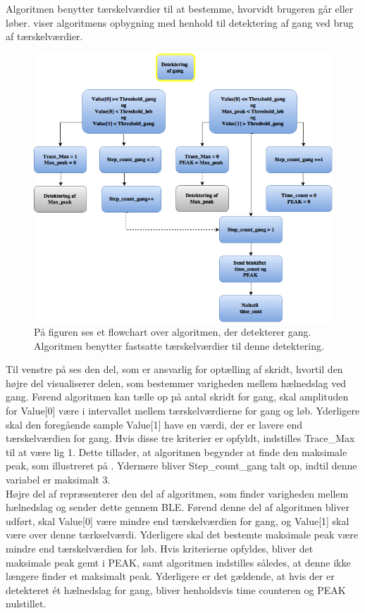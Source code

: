 Algoritmen benytter tærskelværdier til at bestemme, hvorvidt brugeren går eller løber.  viser algoritmens opbygning med henhold til detektering af gang ved brug af tærskelværdier.
\begin{figure}[H]
	\centering
	\includegraphics[scale=0.6]{figures/cDesign/gang_ckode_pseudo.png}
	\caption{På figuren ses et flowchart over algoritmen, der detekterer gang. Algoritmen benytter fastsatte tærskelværdier til denne detektering.}
	\label{fig:gang_pseudo}
\end{figure}\vspace{-0.25cm}
Til venstre på  ses den del, som er ansvarlig for optælling af skridt, hvortil den højre del visualiserer delen, som bestemmer varigheden mellem hælnedslag ved gang. Førend algoritmen kan tælle op på antal skridt for gang, skal amplituden for Value[0] være i intervallet mellem tærskelværdierne for gang og løb. Yderligere skal den foregående sample Value[1] have en værdi, der er lavere end tærskelværdien for gang. Hvis disse tre kriterier er opfyldt, indstilles Trace\_Max til at være lig 1. Dette tillader, at algoritmen begynder at finde den maksimale peak, som illustreret på . Ydermere bliver Step\_count\_gang talt op, indtil denne variabel er maksimalt 3. \\
Højre del af  repræsenterer den del af algoritmen, som finder varigheden mellem hælnedslag og sender dette gennem BLE. Førend denne del af algoritmen bliver udført, skal Value[0] være mindre end tærskelværdien for gang, og Value[1] skal være over denne tærkselværdi. Yderligere skal det bestemte maksimale peak være mindre end tærskelværdien for løb. Hvis kriterierne opfyldes, bliver det maksimale peak gemt i PEAK, samt algoritmen indstilles således, at denne ikke længere finder et maksimalt peak. Yderligere er det gældende, at hvis der er detekteret ét hælnedslag for gang, bliver henholdsvis time counteren og PEAK nulstillet. \\
